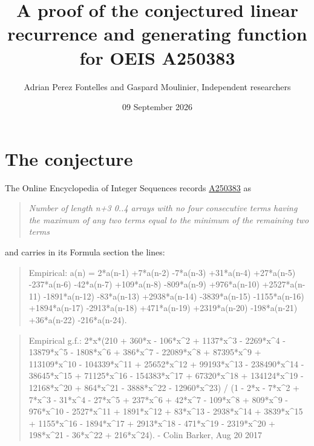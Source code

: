 \documentclass[11pt]{article}
\title{A proof of the conjectured linear recurrence and generating function for OEIS A250383}
\author{Adrian Perez Fontelles and Gaspard Moulinier, Independent researchers}
\date{09 September 2026}
\theoremstyle{definition}
\begin{document}
\maketitle
\section{The conjecture}

The Online Encyclopedia of Integer Sequences records \href{https://oeis.org/A250383}{A250383} as

\begin{quote}\itshape Number of length n+3 0..4 arrays with no four consecutive terms having the maximum of any two terms equal to the minimum of the remaining two terms\end{quote}

and carries in its Formula section the lines:

\begin{quote}\ttfamily Empirical: a(n) = 2*a(n-1) +7*a(n-2) -7*a(n-3) +31*a(n-4) +27*a(n-5) -237*a(n-6) -42*a(n-7) +109*a(n-8) -809*a(n-9) +976*a(n-10) +2527*a(n-11) -1891*a(n-12) -83*a(n-13) +2938*a(n-14) -3839*a(n-15) -1155*a(n-16) +1894*a(n-17) -2913*a(n-18) +471*a(n-19) +2319*a(n-20) -198*a(n-21) +36*a(n-22) -216*a(n-24).\end{quote}

\begin{quote}\ttfamily Empirical g.f.: 2*x*(210 + 360*x - 106*x\textasciicircum{}2 + 1137*x\textasciicircum{}3 - 2269*x\textasciicircum{}4 - 13879*x\textasciicircum{}5 - 1808*x\textasciicircum{}6 + 386*x\textasciicircum{}7 - 22089*x\textasciicircum{}8 + 87395*x\textasciicircum{}9 + 113109*x\textasciicircum{}10 - 104339*x\textasciicircum{}11 + 25652*x\textasciicircum{}12 + 99193*x\textasciicircum{}13 - 238490*x\textasciicircum{}14 - 38645*x\textasciicircum{}15 + 71125*x\textasciicircum{}16 - 154383*x\textasciicircum{}17 + 67320*x\textasciicircum{}18 + 134124*x\textasciicircum{}19 - 12168*x\textasciicircum{}20 + 864*x\textasciicircum{}21 - 3888*x\textasciicircum{}22 - 12960*x\textasciicircum{}23) / (1 - 2*x - 7*x\textasciicircum{}2 + 7*x\textasciicircum{}3 - 31*x\textasciicircum{}4 - 27*x\textasciicircum{}5 + 237*x\textasciicircum{}6 + 42*x\textasciicircum{}7 - 109*x\textasciicircum{}8 + 809*x\textasciicircum{}9 - 976*x\textasciicircum{}10 - 2527*x\textasciicircum{}11 + 1891*x\textasciicircum{}12 + 83*x\textasciicircum{}13 - 2938*x\textasciicircum{}14 + 3839*x\textasciicircum{}15 + 1155*x\textasciicircum{}16 - 1894*x\textasciicircum{}17 + 2913*x\textasciicircum{}18 - 471*x\textasciicircum{}19 - 2319*x\textasciicircum{}20 + 198*x\textasciicircum{}21 - 36*x\textasciicircum{}22 + 216*x\textasciicircum{}24). - Colin Barker, Aug 20 2017\end{quote}
\end{document}
